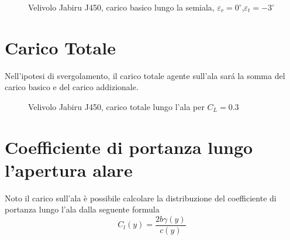 \begin{figure} [H]
\centering
{}
\caption{\footnotesize Velivolo Jabiru J450, carico basico lungo la semiala, $\varepsilon_r=0^\circ$,$\varepsilon_t=-3^\circ$ }
\end{figure}



\section{Carico Totale}

Nell'ipotesi di svergolamento, il carico totale agente sull'ala sará la somma del carico basico e del carico addizionale.




\begin{figure} [h]
\centering
{}
\caption{\footnotesize Velivolo Jabiru J450, carico totale lungo l'ala per {\bfseries $C_L=0.3$}}
\end{figure}

\section{Coefficiente di portanza lungo l'apertura alare}

Noto il carico sull'ala è  possibile calcolare la distribuzione del coefficiente di portanza lungo l'ala dalla seguente formula\\

\begin{equation}
\label{eqn:clala}
C_l(y)=\frac{2b\gamma(y)}{c(y)}
\end{equation}

